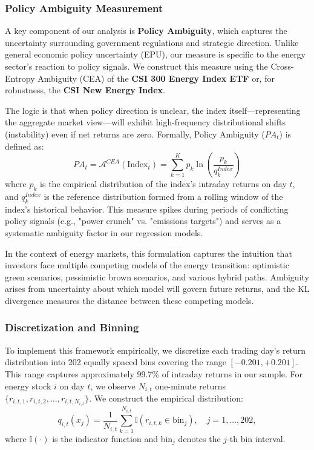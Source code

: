 \documentclass[preprint,12pt,authoryear]{elsarticle}
\begin{document}
\subsubsection{Policy Ambiguity Measurement}

A key component of our analysis is \textbf{Policy Ambiguity}, which captures the uncertainty surrounding government regulations and strategic direction. Unlike general economic policy uncertainty (EPU), our measure is specific to the energy sector's reaction to policy signals. We construct this measure using the Cross-Entropy Ambiguity (CEA) of the \textbf{CSI 300 Energy Index ETF} or, for robustness, the \textbf{CSI New Energy Index}.

The logic is that when policy direction is unclear, the index itself—representing the aggregate market view—will exhibit high-frequency distributional shifts (instability) even if net returns are zero. Formally, Policy Ambiguity ($PA_t$) is defined as:
\begin{equation}
PA_t = \mathcal{A}^{CEA}(\text{Index}_t) = \sum_{k=1}^{K} p_k \ln \left( \frac{p_k}{q_k^{Index}} \right)
\end{equation}
where $p_k$ is the empirical distribution of the index's intraday returns on day $t$, and $q_k^{Index}$ is the reference distribution formed from a rolling window of the index's historical behavior. This measure spikes during periods of conflicting policy signals (e.g., "power crunch" vs. "emissions targets") and serves as a systematic ambiguity factor in our regression models.

In the context of energy markets, this formulation captures the intuition that investors face multiple competing models of the energy transition: optimistic green scenarios, pessimistic brown scenarios, and various hybrid paths. Ambiguity arises from uncertainty about which model will govern future returns, and the KL divergence measures the distance between these competing models.

\subsubsection{Discretization and Binning}

To implement this framework empirically, we discretize each trading day's return distribution into 202 equally spaced bins covering the range $[-0.201, +0.201]$. This range captures approximately 99.7\% of intraday returns in our sample. For energy stock $i$ on day $t$, we observe $N_{i,t}$ one-minute returns $\{r_{i,t,1}, r_{i,t,2}, \ldots, r_{i,t,N_{i,t}}\}$. We construct the empirical distribution:
\begin{equation}
q_{i,t}(x_j) = \frac{1}{N_{i,t}} \sum_{k=1}^{N_{i,t}} \mathbb{I}(r_{i,t,k} \in \text{bin}_j), \quad j = 1, \ldots, 202,
\end{equation}
where $\mathbb{I}(\cdot)$ is the indicator function and $\text{bin}_j$ denotes the $j$-th bin interval.
\end{document}
